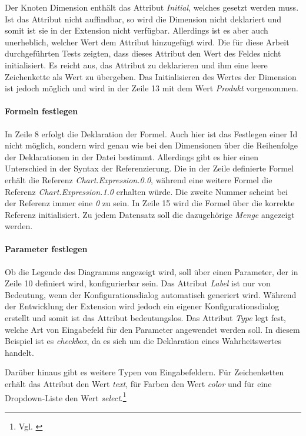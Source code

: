 Der Knoten Dimension enthält das Attribut \textit{Initial}, welches gesetzt werden muss. Ist das Attribut nicht auffindbar, so wird die Dimension nicht deklariert und somit ist sie in der Extension nicht verfügbar. Allerdings ist es aber auch unerheblich, welcher Wert dem Attribut hinzugefügt wird. Die für diese Arbeit durchgeführten Tests zeigten, dass dieses Attribut den Wert des Feldes nicht initialisiert. Es reicht aus, das Attribut zu deklarieren und ihm eine leere Zeichenkette als Wert zu übergeben. Das Initialisieren des Wertes der Dimension ist jedoch möglich und wird in der Zeile 13 mit dem Wert \textit{Produkt} vorgenommen.


\paragraph{Formeln festlegen}

In Zeile 8 erfolgt die Deklaration der Formel. Auch hier ist das Festlegen einer Id nicht möglich, sondern wird genau wie bei den Dimensionen über die Reihenfolge der Deklarationen in der Datei bestimmt. Allerdings gibt es hier einen Unterschied in der Syntax der Referenzierung. Die in der Zeile definierte Formel erhält die Referenz \textit{Chart.Expression.0.0}, während eine weitere Formel die Referenz \textit{Chart.Expression.1.0} erhalten würde. Die zweite Nummer scheint bei der Referenz immer eine \textit{0} zu sein. In Zeile 15 wird die Formel über die korrekte Referenz initialisiert. Zu jedem Daten\-satz soll die dazugehörige \textit{Menge} angezeigt werden.

\paragraph{Parameter festlegen}


Ob die Legende des Diagramms angezeigt wird, soll über einen Parameter, der in Zeile 10 definiert wird, konfigurierbar sein. Das Attribut \textit{Label} ist nur von Bedeutung, wenn der Konfigurations\-dialog automatisch generiert wird. Während der Entwicklung der Extension wird jedoch ein eigener Konfigurations\-dialog erstellt und somit ist das Attribut bedeutungslos. Das Attribut \textit{Type} legt fest, welche Art von Eingabefeld für den Parameter angewendet werden soll. In diesem Beispiel ist es \textit{checkbox}, da es sich um die Deklaration eines Wahrheits\-wertes handelt. 

Darüber hinaus gibt es weitere Typen von Eingabefeldern. Für Zeichenketten erhält das Attribut den Wert \textit{text}, für Farben den Wert \textit{color} und für eine Dropdown-Liste den Wert \textit{select}.\footnote{Vgl. \cite{ExtensionDefinitionFileQlikCommunity}}

